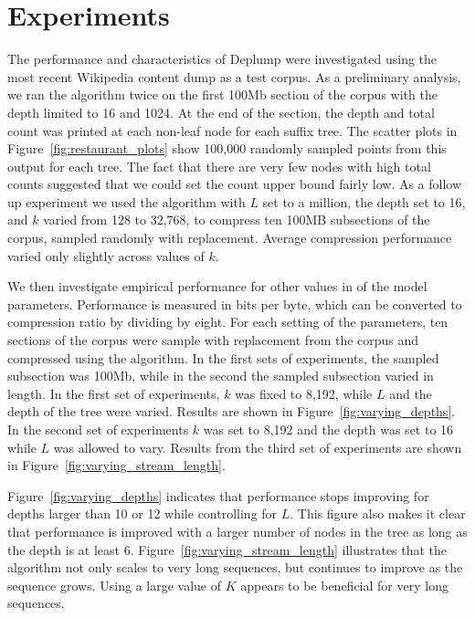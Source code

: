 \section{Experiments}
\label{sec:experiments}
The performance and characteristics of Deplump were investigated using the most recent Wikipedia content dump as a test corpus.  As a preliminary analysis, we ran the algorithm twice on the first 100Mb section of the corpus with the depth limited to 16 and 1024.  At the end of the section, the depth and total count was printed at each non-leaf node for each suffix tree.  The scatter plots in Figure~\ref{fig:restaurant_plots} show 100,000 randomly sampled points from this output for each tree.  The fact that there are very few nodes with high total counts suggested that we could set the count upper bound fairly low.  As a follow up experiment we used the algorithm with $L$ set to a million, the depth set to 16, and $k$ varied from 128 to 32,768, to compress ten 100MB subsections of the corpus, sampled randomly with replacement.  Average compression performance varied only slightly across values of $k$.

We then investigate empirical performance for other values in of the model parameters.  Performance is measured in bits per byte, which can be converted to compression ratio by dividing by eight.  For each setting of the parameters, ten sections of the corpus were sample with replacement from the corpus and compressed using the algorithm.  In the first sets of experiments, the sampled subsection was 100Mb, while in the second the sampled subsection varied in length.  In the first set of experiments, $k$ was fixed to 8,192, while $L$ and the depth of the tree were varied. Results are shown in Figure~\ref{fig:varying_depths}. In the second set of experiments $k$ was set to 8,192 and the depth was set to 16 while $L$ was allowed to vary.  Results from the third set of experiments are shown in Figure~\ref{fig:varying_stream_length}.

Figure~\ref{fig:varying_depths} indicates that performance stops improving for depths larger than 10 or 12 while controlling for $L$.  This figure also makes it clear that performance is improved with a larger number of nodes in the tree as long as the depth is at least 6.  Figure~\ref{fig:varying_stream_length} illustrates that the algorithm not only scales to very long sequences, but continues to improve as the sequence grows.  Using a large value of $K$ appears to be beneficial for very long sequences.

